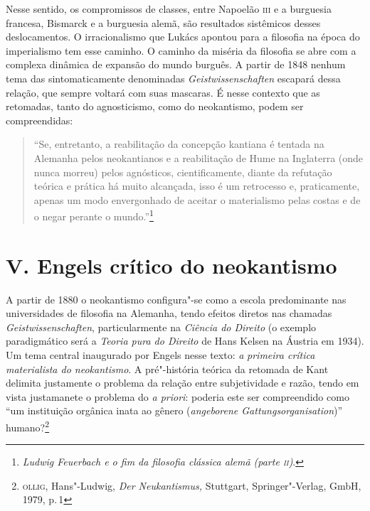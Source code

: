Nesse sentido, os compromissos de classes, entre Napoelão \textsc{iii} e a
burguesia francesa, Bismarck e a burguesia alemã, são resultados
sistêmicos desses deslocamentos. O irracionalismo que Lukács apontou
para a filosofia na época do imperialismo tem esse caminho. O caminho da
miséria da filosofia se abre com a complexa dinâmica de expansão do
mundo burguês. A partir de 1848 nenhum tema das sintomaticamente
denominadas \emph{Geistwissenschaften} escapará dessa relação, que
sempre voltará com suas mascaras. É nesse contexto que as retomadas,
tanto do agnosticismo, como do neokantismo, podem ser compreendidas:

\begin{quote}
``Se, entretanto, a reabilitação da concepção kantiana é tentada na
Alemanha pelos neokantianos e a reabilitação de Hume na Inglaterra (onde
nunca morreu) pelos agnósticos, cientificamente, diante da refutação
teórica e prática há muito alcançada, isso é um retrocesso e,
praticamente, apenas um modo envergonhado de aceitar o materialismo
pelas costas e de o negar perante o mundo.''\footnote{\emph{Ludwig
  Feuerbach e o fim da filosofia clássica alemã (parte \textsc{ii})}.}
\end{quote}

\section*{V. Engels crítico do neokantismo}

A partir de 1880 o neokantismo configura"-se como a escola predominante
nas universidades de filosofia na Alemanha, tendo efeitos diretos nas
chamadas \emph{Geistwissenschaften}, particularmente na \emph{Ciência do
Direito} (o exemplo paradigmático será a \emph{Teoria pura do Direito}
de Hans Kelsen na Áustria em 1934). Um tema central inaugurado por
Engels nesse texto: \emph{a} \emph{primeira crítica materialista do
neokantismo}. A pré"-história teórica da retomada de Kant delimita
justamente o problema da relação entre subjetividade e razão, tendo em
vista justamanete o problema do \emph{a priori}: poderia este ser
compreendido como ``um instituição orgânica inata ao gênero
(\emph{angeborene Gattungsorganisation})'' humano?\footnote{\textsc{ollig},
  Hans"-Ludwig, \emph{Der Neukantismus,} Stuttgart, Springer"-Verlag,
  GmbH, 1979, p.\,1}

